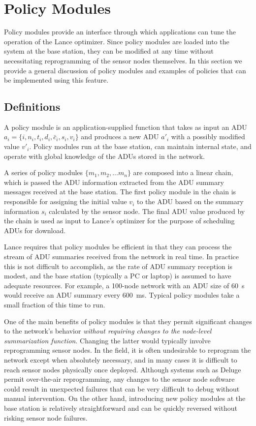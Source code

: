 \section{Policy Modules}
\label{lance-sec-policies}

Policy modules provide an interface through which applications can tune the
operation of the Lance optimizer. Since policy modules are loaded into the
system at the base station, they can be modified at any time without
necessitating reprogramming of the sensor nodes themselves. In this section
we provide a general discussion of policy modules and examples of policies
that can be implemented using this feature.

\subsection{Definitions}

A policy module is an application-supplied function that takes as input an
ADU $a_i = \{ i, n_i, t_i, d_i, \bar{c}_i, s_i, v_i \}$ and produces a new
ADU $a'_i$ with a possibly modified value $v'_i$. Policy modules run at the
base station, can maintain internal state, and operate with global knowledge
of the ADUs stored in the network.

A series of policy modules $\{m_1, m_2, ... m_n\}$ are composed into a linear
chain, which is passed the ADU information extracted from the ADU summary
messages received at the base station. The first policy module in the chain
is responsible for assigning the initial value $v_i$ to the ADU based on the
summary information $s_i$ calculated by the sensor node. The final ADU value
produced by the chain is used as input to Lance's optimizer for the purpose
of scheduling ADUs for download.

Lance requires that policy modules be efficient in that they can process the
stream of ADU summaries received from the network in real time. In practice
this is not difficult to accomplish, as the rate of ADU summary reception is
modest, and the base station (typically a PC or laptop) is assumed to have
adequate resources. For example, a 100-node network with an ADU size of
60~s would receive an ADU summary every 600~ms. Typical policy modules
take a small fraction of this time to run.

One of the main benefits of policy modules is that they permit significant
changes to the network's behavior \textit{without requiring changes to the
node-level summarization function}. Changing the latter would typically
involve reprogramming sensor nodes. In the field, it is often undesirable to
reprogram the network except when absolutely necessary, and in many cases it
is difficult to reach sensor nodes physically once deployed. Although systems
such as Deluge~\cite{deluge} permit over-the-air reprogramming, any changes
to the sensor node software could result in unexpected failures that can be
very difficult to debug without manual intervention. On the other hand,
introducing new policy modules at the base station is relatively
straightforward and can be quickly reversed without risking sensor node
failures.

